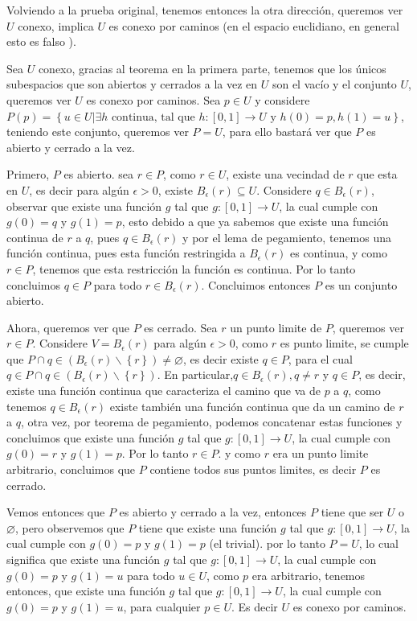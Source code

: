 \documentclass[]{article}
\newcommand{\set}[1]{\left\lbrace #1 \right\rbrace}
\newcommand{\qt}[1]{\textrm{#1}}
\newcommand{\function}[3]{#1 : #2 \rightarrow #3}
\newcommand{\contained}{\subseteq}
\begin{document}
Volviendo a la prueba original, tenemos entonces la otra dirección, queremos ver $U$ conexo, implica $ U $ es conexo por caminos (en el espacio euclidiano, en general esto es falso ).

Sea $U$ conexo, gracias al teorema en la primera parte, tenemos que los únicos subespacios que son abiertos y cerrados a la vez en $ U $ son el vacío y el conjunto $ U $, queremos ver $U$ es conexo por caminos. Sea $ p \in U  $ y considere $  P(p) = \set{u \in U | \exists h  \qt{ continua, tal que } \function{h}{[0,1]}{U} \qt{ y } h(0) = p, h(1) = u  } $, teniendo este conjunto, queremos ver $ P = U $, para ello bastará ver que $ P $ es abierto y cerrado a la vez.

Primero, $P$ es abierto. sea $r \in P$, como $ r \in U $, existe una vecindad de $r$ que esta en $U$, es decir para algún $ \epsilon > 0 $, existe $ B_\epsilon(r) \contained U $. Considere $ q \in B_\epsilon(r) $, observar que existe una función $ g $ tal que $ \function{g}{[0,1]}{U} $, la cual cumple con $ g(0) = q $ y $ g(1) = p $, esto debido a que ya sabemos que existe una función continua de $r$ a $q$, pues $q \in B_\epsilon(r)$ y por el lema de pegamiento, tenemos una función continua, pues esta función restringida a $ B_\epsilon(r) $ 
es continua, y como $r \in P$, tenemos que  esta restricción la función es continua. Por lo tanto concluimos $ q \in P $ para todo $ r  \in B_\epsilon(r) $. Concluimos entonces $P$ es un conjunto abierto.

Ahora, queremos ver que $ P $ es cerrado. Sea $r$ un punto limite de $P$, queremos ver $r \in P$. Considere $V = B_\epsilon(r)$ para algún $ \epsilon > 0 $, como $r$ es punto limite, se cumple que $ P \cap q \in \left( B_\epsilon(r) \backslash \set{r} \right) \neq \varnothing  $, es decir existe $ q \in P  $, para el cual $ q \in  P \cap q \in \left( B_\epsilon(r) \backslash \set{r} \right) $. En particular,$ q \in B_\epsilon(r) , q \neq r $ y $ q \in P $, es decir, existe una función continua que caracteriza el camino que va de $ p $ a $ q $, como tenemos  $ q \in B_\epsilon(r) $ existe también una función continua que da un camino de $r$ a $q$, otra vez, por teorema de pegamiento, podemos concatenar estas funciones y concluimos que existe una función $ g $ tal que $ \function{g}{[0,1]}{U} $, la cual cumple con $ g(0) = r $ y $ g(1) = p $. Por lo tanto $r \in P$. y como $r$ era un punto limite arbitrario, concluimos que $ P $ contiene todos sus puntos limites, es decir $ P $ es cerrado. 

Vemos entonces que $P$ es abierto y cerrado a la vez, entonces $P$ tiene que ser $U$ o $\varnothing$, pero observemos que $P$ tiene que existe una función $ g $ tal que $ \function{g}{[0,1]}{U} $, la cual cumple con $ g(0) = p $ y $ g(1) = p $ (el trivial). por lo tanto $P = U$, lo cual significa que existe una función $ g $ tal que $ \function{g}{[0,1]}{U} $, la cual cumple con $ g(0) = p $ y $ g(1) = u $ para todo $u \in U$, como $p$ era arbitrario, tenemos entonces, que existe una función $ g $ tal que $ \function{g}{[0,1]}{U} $, la cual cumple con $ g(0) = p $ y $ g(1) = u $, para  cualquier $ p \in U $. Es decir $U$ es conexo por caminos. \qedsymbol
\end{document}
